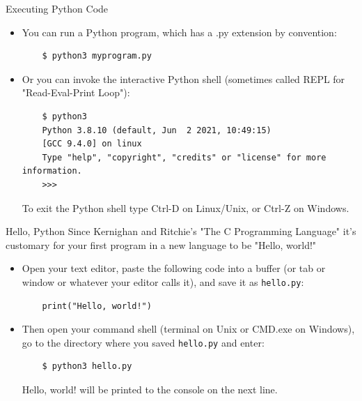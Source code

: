 \documentclass[smaller, aspectratio=1610]{beamer}
\begin{document}
\begin{frame}[label={sec:orgc8d8cfb},fragile]{Executing Python Code}
 \begin{itemize}
\item You can run a Python program, which has a .py extension by convention:

\lstset{language=sh,label= ,caption= ,captionpos=b,numbers=none}
\begin{lstlisting}
    $ python3 myprogram.py
\end{lstlisting}

\item Or you can invoke the interactive Python shell (sometimes called REPL for "Read-Eval-Print Loop"):

\lstset{language=sh,label= ,caption= ,captionpos=b,numbers=none}
\begin{lstlisting}
    $ python3
    Python 3.8.10 (default, Jun  2 2021, 10:49:15)
    [GCC 9.4.0] on linux
    Type "help", "copyright", "credits" or "license" for more information.
    >>>
\end{lstlisting}

To exit the Python shell type Ctrl-D on Linux/Unix, or Ctrl-Z on Windows.
\end{itemize}
\end{frame}

\begin{frame}[label={sec:org71a8958},fragile]{Hello, Python}
 Since Kernighan and Ritchie's "The C Programming Language" it's customary for your first program in a new language to be "Hello, world!"

\begin{itemize}
\item Open your text editor, paste the following code into a buffer (or tab or window or whatever your editor calls it), and save it as \texttt{hello.py}:

\lstset{language=Python,label= ,caption= ,captionpos=b,numbers=none}
\begin{lstlisting}
    print("Hello, world!")
\end{lstlisting}

\item Then open your command shell (terminal on Unix or CMD.exe on Windows), go to the directory where you saved \texttt{hello.py} and enter:

\lstset{language=sh,label= ,caption= ,captionpos=b,numbers=none}
\begin{lstlisting}
    $ python3 hello.py
\end{lstlisting}

Hello, world! will be printed to the console on the next line.
\end{itemize}
\end{frame}
\end{document}
